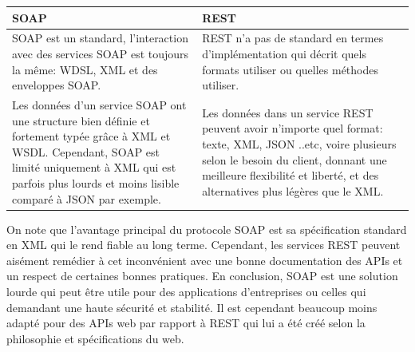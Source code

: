 \begin{tabu} to \textwidth { | X[l] | X[l] | }
\hline
{} 
SOAP & REST \\
\hline
   SOAP est un standard, l'interaction avec des services SOAP est toujours la même: WDSL, XML et des enveloppes SOAP.
   &
   REST n'a pas de standard en termes d'implémentation qui décrit quels formats utiliser ou quelles méthodes utiliser. \\
   \hline
   Les données d'un service SOAP ont une structure bien définie et fortement typée grâce à XML et WSDL.
   Cependant, SOAP est limité uniquement à XML qui est parfois plus lourds et moins lisible comparé à JSON par exemple.
   &  
   Les données dans un service REST peuvent avoir n'importe quel format: texte, XML, JSON ..etc, voire plusieurs selon le besoin du client, donnant une meilleure flexibilité et liberté, et des alternatives plus légères que le XML.\\
   \hline
\end{tabu}
   \label{tableSoapVsRest}

On note que l'avantage principal du protocole SOAP est sa spécification standard en XML qui le rend fiable au long terme. Cependant, les services REST peuvent aisément remédier à cet inconvénient avec une bonne documentation des APIs et un respect de certaines bonnes pratiques.
\newline
En conclusion, SOAP est une solution lourde qui peut être utile pour des applications d'entreprises ou celles qui demandant une haute sécurité et stabilité. Il est cependant beaucoup moins adapté pour des APIs web par rapport à REST qui lui a été créé selon la philosophie et spécifications du web.

